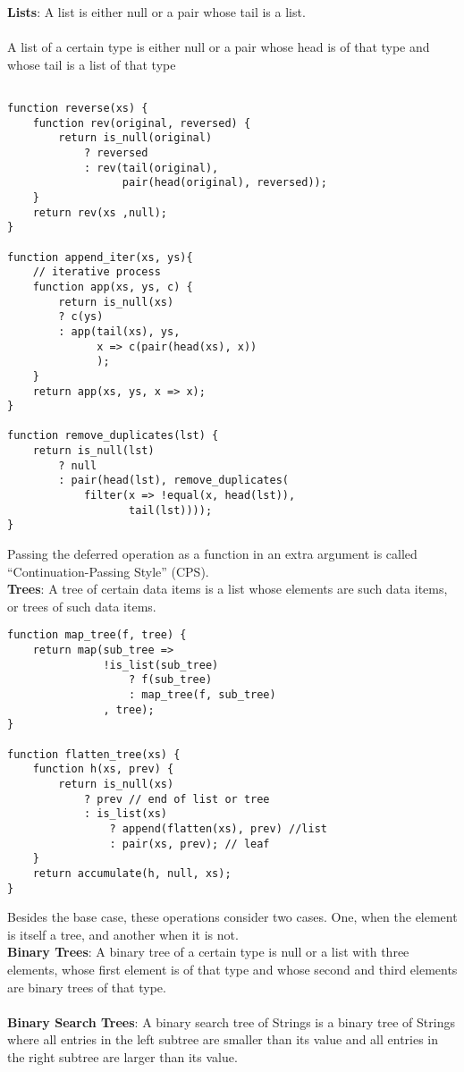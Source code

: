 \documentclass[a4paper]{article} \usepackage[backend=biber, style=numeric, sorting=none]{biblatex}
\begin{document}
\begin{multicols*}{4}
{\small\textbf{Lists}}: A list is either null or a pair whose tail is a list.
\\ \\
A list of a certain type is either null or a pair whose head is of that type and whose tail is a list of that type

\begin{verbatim}

function reverse(xs) {
    function rev(original, reversed) {
        return is_null(original)
            ? reversed
            : rev(tail(original),
                  pair(head(original), reversed));
    }
    return rev(xs ,null);
}

function append_iter(xs, ys){
    // iterative process
    function app(xs, ys, c) {
        return is_null(xs)
        ? c(ys)
        : app(tail(xs), ys, 
              x => c(pair(head(xs), x))
              );
    }
    return app(xs, ys, x => x);
}

function remove_duplicates(lst) {
    return is_null(lst)
        ? null
        : pair(head(lst), remove_duplicates(
            filter(x => !equal(x, head(lst)),
                   tail(lst))));
}
\end{verbatim}
Passing the deferred operation as a function in an extra argument is called “Continuation-Passing Style” (CPS). \\

{\small\textbf{Trees}}: A tree of certain data items is a list whose elements are such data items, or trees of such data items.

\begin{verbatim}
function map_tree(f, tree) {
    return map(sub_tree =>
               !is_list(sub_tree)
                   ? f(sub_tree)
                   : map_tree(f, sub_tree)
               , tree);
}

function flatten_tree(xs) {
    function h(xs, prev) {
        return is_null(xs)
            ? prev // end of list or tree
            : is_list(xs)
                ? append(flatten(xs), prev) //list
                : pair(xs, prev); // leaf
    }
    return accumulate(h, null, xs);
}
\end{verbatim}

Besides the base case, these operations consider two cases. One, when the element is itself a tree, and another when it is not. \\
\vfill\null
\columnbreak
{\small\textbf{Binary Trees}}: A binary tree of a certain type is null or a list with three elements, whose first element is of that type and whose second and third elements are binary trees of that type.
\\ \\
{\small\textbf{Binary Search Trees}}: A binary search tree of Strings is a binary tree of Strings where all entries in the left subtree are smaller than its value and all entries in the right subtree are larger than its value.


\end{multicols*}
\end{document}
